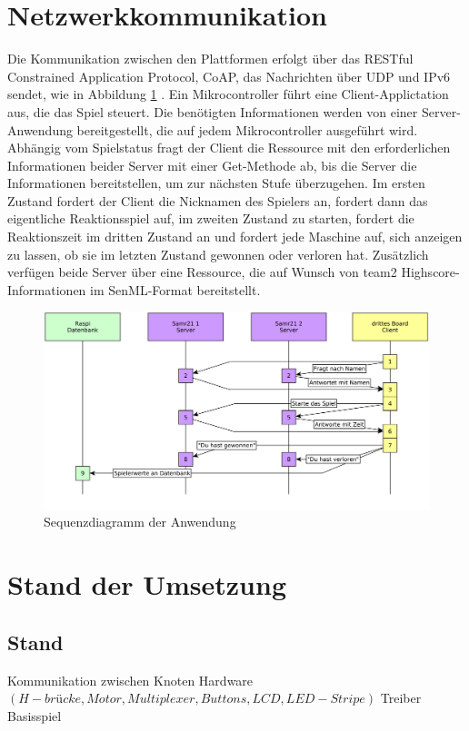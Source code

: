 \documentclass[a4paper]{article}
\begin{document}
\section{Netzwerkkommunikation}
  \label{sec:net}
  Die Kommunikation zwischen den Plattformen erfolgt über das RESTful Constrained
  Application Protocol, CoAP, das Nachrichten über UDP und IPv6 sendet, wie in
  Abbildung \ref{fig:seq_diagram} . Ein Mikrocontroller führt eine
  Client-Applictation aus, die das Spiel steuert. Die benötigten Informationen
  werden von einer Server-Anwendung bereitgestellt, die auf jedem Mikrocontroller
  ausgeführt wird. Abhängig vom Spielstatus fragt der Client die Ressource mit
  den erforderlichen Informationen beider Server mit einer Get-Methode ab, bis
  die Server die Informationen bereitstellen, um zur nächsten Stufe überzugehen.
  Im ersten Zustand fordert der Client die Nicknamen des Spielers an, fordert
  dann das eigentliche Reaktionsspiel auf, im zweiten Zustand zu starten, fordert
  die Reaktionszeit im dritten Zustand an und fordert jede Maschine auf, sich
  anzeigen zu lassen, ob sie im letzten Zustand gewonnen oder verloren hat.
  Zusätzlich verfügen beide Server über eine Ressource, die auf Wunsch von team2
  Highscore-Informationen im SenML-Format bereitstellt.
  \begin{figure}[h]
    \centering
    \includegraphics[scale=0.1]{team1_kommunikation.png}
    \caption{\label{fig:seq_diagram}Sequenzdiagramm der Anwendung}
  \end{figure}

\section{Stand der Umsetzung}
  \label{sec:status}
  \subsection{Stand}
  Kommunikation zwischen Knoten
  Hardware $(H-brücke, Motor, Multiplexer, Buttons, LCD, LED-Stripe )$
  Treiber
  Basisspiel
\end{document}
